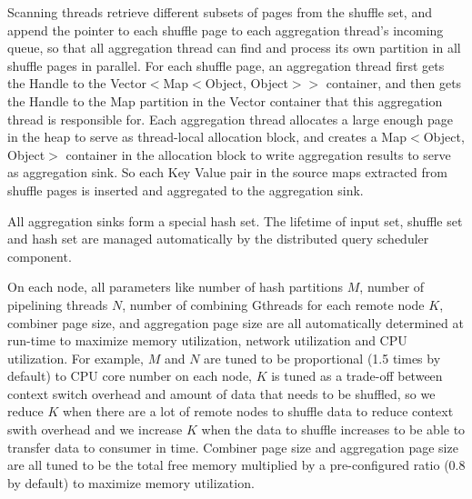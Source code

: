 Scanning threads retrieve different subsets of pages from the shuffle set, and append the pointer to each shuffle page to each aggregation thread's incoming queue, so that all aggregation thread can find and process its own partition in all shuffle pages in parallel. For each shuffle page, an aggregation thread first gets the Handle to the Vector$<$Map$<$Object, Object$>$$>$ container, and then gets the Handle to the Map partition in the Vector container that this aggregation thread is responsible for. Each aggregation thread allocates a large enough page in the heap to serve as thread-local allocation block, and creates a Map$<$Object, Object$>$ container in the allocation block to write aggregation results to serve as aggregation sink. So each Key Value pair in the source maps extracted from shuffle pages is inserted and aggregated to the aggregation sink. 

All aggregation sinks form a special hash set. The lifetime of input set, shuffle set and hash set are managed automatically by the distributed query scheduler component.


\vspace{5pt}

On each node, all parameters like number of hash partitions $M$, number of pipelining threads $N$, number of combining Gthreads for each remote node $K$, combiner page size, and aggregation page size are all automatically determined at run-time to maximize memory utilization, network utilization and CPU utilization. For example, $M$ and $N$ are tuned to be proportional (1.5 times by default) to CPU core number on each node, $K$ is tuned as a trade-off between context switch overhead and amount of data that needs to be shuffled, so we reduce $K$ when there are a lot of remote nodes to shuffle data to reduce context swith overhead and we increase $K$ when the data to shuffle increases to be able to transfer data to consumer in time. Combiner page size and aggregation page size are all tuned to be the total free memory multiplied by a pre-configured ratio (0.8 by default) to maximize memory utilization. 



